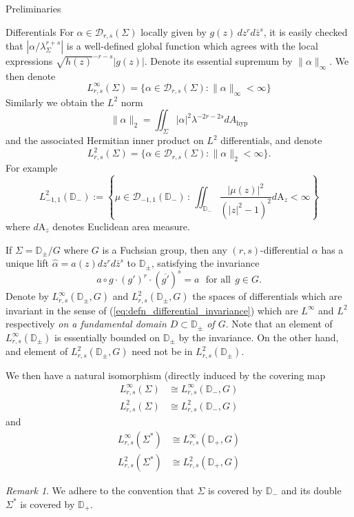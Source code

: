 \documentclass[12pt]{amsart}
\newcommand{\disk}{\ensuremath{\mathbb{D}} } %
\newcommand{\riem}{\Sigma}  %
\theoremstyle{plain}
\theoremstyle{definition}
\theoremstyle{remark}
\newtheorem{remark}[theorem]{Remark}
\numberwithin{equation}{section} %
\numberwithin{figure}{section} %
\begin{document}
\begin{section}{Preliminaries}
\begin{subsection}{Differentials}
 For $\alpha \in \mathscr{D}_{r,s}(\Sigma)$ locally given by $g(z)\, dz^r d\bar{z}^s$, it is easily checked that 
 $|\alpha / \lambda_\riem^{r+s}|$ 
 is a well-defined global function which agrees with the local expressions $\sqrt{h(z)}^{-r-s} |g(z)|$. Denote its essential supremum by $\| \alpha \|_\infty$.  
 We then denote 
 \[  L^\infty_{r,s}(\riem) = \{ \alpha \in \mathscr{D}_{r,s}(\Sigma) : \| \alpha \|_\infty < \infty \} \]
 Similarly we obtain the $L^2$ norm
  \[   \| \alpha \|_2 = \iint_{\riem} | \alpha|^2 \lambda^{-2r-2s} dA_{\mathrm{hyp}}     \]
 and the associated Hermitian inner product on $L^2$ differentials, and denote
 \[  L^2_{r,s}(\riem) = \{ \alpha \in \mathscr{D}_{r,s}(\Sigma) :  \| \alpha \|_{2} < \infty \}. \] 
 For example 
\[  L^2_{-1,1}(\disk_-) := \left\{  \mu \in \mathscr{D}_{-1,1}(\disk_-) \,:\, \iint_{\disk_-} \frac{|\mu(z)|^2}{(|z|^2-1)^2} d\mathrm{A}_z < \infty \right\}   \]
where $d\mathrm{A}_z$ denotes Euclidean area measure. 


 If $\riem = \mathbb{D}_\pm /G$ where $G$ is a Fuchsian group, then any $(r,s)$-differential $\alpha$ has a unique lift $\hat{\alpha} = a(z) dz^r d\bar{z}^s$ to $\disk_\pm$, satisfying the invariance 
 \begin{equation} \label{eq:defn_differential_invariance}
   a \circ g \cdot (g')^r \cdot (\overline{g'})^s = a \ \ \ \text{for all} \ \ g \in G. 
 \end{equation}
 Denote by $L^\infty_{r,s}(\disk_\pm,G)$ and $L^2_{r,s}(\disk_\pm,G)$ the spaces of differentials which are invariant in the sense of (\ref{eq:defn_differential_invariance}) which are $L^\infty$ and $L^2$ respectively {\it on a fundamental domain $D \subset \disk_\pm$ of $G$}. 
 Note that an element of $L^\infty_{r,s}(\disk_\pm)$ is essentially bounded on $\disk_\pm$ by the invariance. On the other hand, and element of  $L^2_{r,s}(\disk_\pm,G)$ need not be in $L^2_{r,s}(\disk_\pm)$.
 
 We then have a natural isomorphism (directly induced by the covering map
 \begin{align} \label{eq:differential_lift_direct_isomorphisms}
  L^\infty_{r,s}(\riem) & \cong L^\infty_{r,s}(\disk_-,G) \nonumber \\
  L^2_{r,s}(\riem) & \cong L^2_{r,s}(\disk_-,G)
 \end{align}
 and 
 \begin{align} \label{eq:differential_lift_direct_isomorphisms_double}
  L^\infty_{r,s}(\riem^*) & \cong L^\infty_{r,s}(\disk_+,G) \nonumber \\
  L^2_{r,s}(\riem^*) & \cong L^2_{r,s}(\disk_+,G)
 \end{align}
 \begin{remark} \label{re: } We adhere to the convention that $\riem$ is covered by $\disk_-$ and its double $\riem^*$ is covered by $\disk_+$. 
 \end{remark}
 

\end{subsection}
\end{section}
\end{document}
